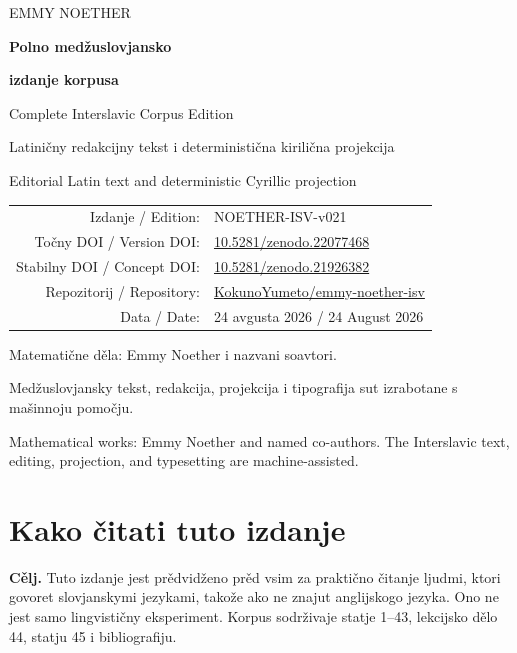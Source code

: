 \documentclass[11pt]{article}
\newcommand{\doiurl}[1]{\href{https://doi.org/#1}{#1}}
\newcommand{\repo}{\href{https://github.com/KokunoYumeto/emmy-noether-isv}{KokunoYumeto/emmy-noether-isv}}
\begin{document}
\thispagestyle{empty}
\begin{center}
\vspace*{1.2cm}
{\sffamily\color{NoetherBlue}\Large EMMY NOETHER\par}
\vspace{1.3cm}
{\sffamily\bfseries\Huge Polno medžuslovjansko\par}
{\sffamily\bfseries\Huge izdanje korpusa\par}
\vspace{0.55cm}
{\sffamily\Large Complete Interslavic Corpus Edition\par}
\vspace{1.2cm}
{\large Latiničny redakcijny tekst i deterministična kirilična projekcija\par}
{\large Editorial Latin text and deterministic Cyrillic projection\par}
\vfill
\begin{tabular}{@{}rl@{}}
Izdanje / Edition: & NOETHER-ISV-v021\\
Točny DOI / Version DOI: & \doiurl{10.5281/zenodo.22077468}\\
Stabilny DOI / Concept DOI: & \doiurl{10.5281/zenodo.21926382}\\
Repozitorij / Repository: & \repo\\
Data / Date: & 24 avgusta 2026 / 24 August 2026
\end{tabular}
\vfill
{\small Matematične děla: Emmy Noether i nazvani soavtori.\par}
{\small Medžuslovjansky tekst, redakcija, projekcija i tipografija sut izrabotane s mašinnoju pomočju.\par}
{\small Mathematical works: Emmy Noether and named co-authors. The Interslavic text, editing, projection, and typesetting are machine-assisted.\par}
\end{center}
\clearpage

\section*{Kako čitati tuto izdanje}

\textbf{Cělj.} Tuto izdanje jest prědvidženo prěd vsim za praktično čitanje ljudmi, ktori govoret slovjanskymi jezykami, takože ako ne znajut anglijskogo jezyka. Ono ne jest samo lingvističny eksperiment. Korpus sodrživaje statje 1--43, lekcijsko dělo 44, statju 45 i bibliografiju.
\end{document}
